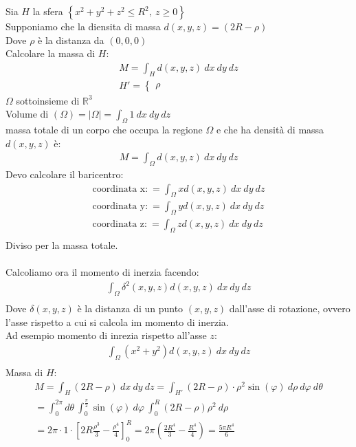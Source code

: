 \documentclass[a4paper, oneside]{article}
\begin{document}
  \begin{example}
    Sia $H$ la sfera $\left\{ x^2+y^2+z^2 \leq R^2, \ z \geq 0 \right\} $\\
    Supponiamo che la diensita di massa $d(x,y,z) = (2R-\rho)$\\
    Dove $\rho$ è la distanza da $(0,0,0)$\\
    Calcolare la massa di $H$:
    \begin{gather*}
      M = \int_H d(x,y,z) \ dx \ dy \ dz \\
      H' = \begin{cases}
        \rho
      \end{cases}
    \end{gather*}
    $\Omega$ sottoinsieme di $\mathbb{R}^3$\\
    Volume di $(\Omega) = \left\lvert \Omega \right\rvert = \int_\Omega 1 \ dx \ dy \ dz $\\
    massa totale di un corpo che occupa la regione $\Omega$ e che ha densità di massa $d(x,y,z)$ è:
    \begin{gather*}
      M = \int_\Omega d(x,y,z) \ dx \ dy \ dz
    \end{gather*}
    Devo calcolare il baricentro:
    \begin{gather*}
      \text{coordinata x:} \ = \int_\Omega x d(x,y,z) \ dx \ dy \ dz\\
      \text{coordinata y:} \ = \int_\Omega y d(x,y,z) \ dx \ dy \ dz\\
      \text{coordinata z:} \ = \int_\Omega z d(x,y,z) \ dx \ dy \ dz\\
    \end{gather*}
    Diviso per la massa totale.\\
    \hfil\\
    Calcoliamo ora il momento di inerzia facendo:
    \begin{gather*}
      \int_\Omega \delta^2(x,y,z) d(x,y,z) \ dx \ dy \ dz \\
    \end{gather*}
    Dove $\delta(x,y,z)$ è la distanza di un punto $(x,y,z)$ dall'asse di rotazione, ovvero l'asse rispetto a cui si calcola im momento di inerzia.\\
    Ad esempio momento di inrezia rispetto all'asse $z$:
    \begin{gather*}
      \int_\Omega (x^2+y^2) d(x,y,z) \ dx \ dy \ dz \\
    \end{gather*}
    Massa di $H$:
    \begin{gather*}
      M = \int_H (2R-\rho) \ dx \ dy \ dz = \int_{H'} (2R-\rho) \cdot \rho^2 \sin(\varphi) \ d\rho \ d\varphi \ d\theta \\
      = \int_0^{2\pi} d\theta \ \int_0^{\frac{\pi}{2}} \sin(\varphi) \ d\varphi \ \int_0^R (2R-\rho) \rho^2 \ d\rho \\
      = 2\pi \cdot 1 \cdot \left[ 2R \frac{\rho^3}{3} - \frac{\rho^4}{4} \right]_0^R = 2\pi \left( \frac{2R^4}{3} - \frac{R^4}{4} \right) = \frac{5\pi R^4}{6} \\
    \end{gather*}
  \end{example}
\end{document}
